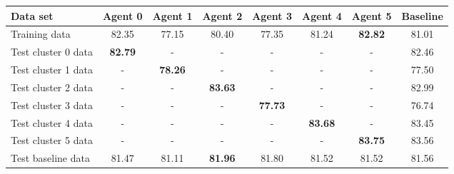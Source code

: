 
    \begin{tabular}{l c c c c c c c}
    \toprule

    Data set & Agent 0 & Agent 1 & Agent 2 & Agent 3 & Agent 4 & Agent 5 & Baseline \\
    
    \midrule
    Training data & 82.35 & 77.15 & 80.40 & 77.35 & 81.24 & \textbf{82.82} & 81.01\\
    \hline
    Test cluster 0 data & \textbf{82.79} & - & - & - & - & - & 82.46 \\
    Test cluster 1 data & - & \textbf{78.26} & - & - & - & - & 77.50\\
    Test cluster 2 data & - & - & \textbf{83.63} & - & - & - & 82.99\\
    Test cluster 3 data & - & - & - & \textbf{77.73} & - & - & 76.74\\
    Test cluster 4 data & - & - & - & - & \textbf{83.68} & - & 83.45\\
    Test cluster 5 data & - & - & - & - & - & \textbf{83.75} & 83.56\\
    Test baseline data & 81.47 & 81.11 & \textbf{81.96} & 81.80 & 81.52 & 81.52 & 81.56\\
    \bottomrule
        
    \end{tabular}